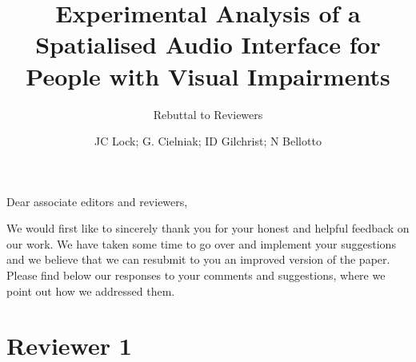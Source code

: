 \documentclass{scrartcl}
\begin{document}
\title{Experimental Analysis of a Spatialised Audio Interface for People with Visual Impairments}
\subtitle{Rebuttal to Reviewers}

\author{JC Lock; G. Cielniak; ID Gilchrist; N Bellotto}

\maketitle

\noindent Dear associate editors and reviewers,

We would first like to sincerely thank you for your honest and helpful feedback on our work.
We have taken some time to go over and implement your suggestions and we believe that we can resubmit to you an improved version of the paper. 
Please find below our responses to your comments and suggestions, where we point out how we addressed them.

\section*{Reviewer 1} 
\end{document}
